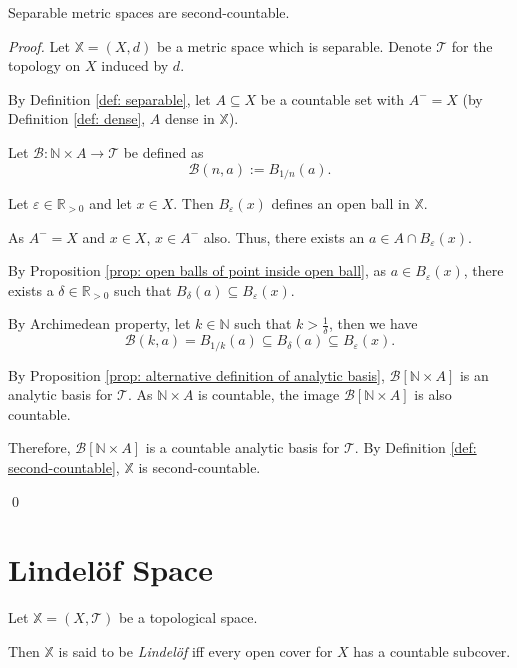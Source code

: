 \begin{proposition}
	Separable metric spaces are second-countable.
	
	\begin{proof}
		Let $\mathbb X = (X, d)$ be a metric space which is separable. Denote $\mathcal T$ for the topology on $X$ induced by $d$.
		
		By Definition \ref{def: separable}, let $A \subseteq X$ be a countable set with $A^- = X$ (by Definition \ref{def: dense}, $A$ dense in $\mathbb X$).
		
		Let $\mathcal B: \mathbb N \times A \to \mathcal T$ be defined as
		$$
		\mathcal B(n, a) := B_{1/n}(a).
		$$
		
		Let $\varepsilon \in \mathbb R_{> 0}$ and let $x \in X$. Then $B_\varepsilon(x)$ defines an open ball in $\mathbb X$.
		
		As $A^- = X$ and $x \in X$, $x \in A^-$ also. Thus, there exists an $a \in A \cap B_\varepsilon (x)$.
		
		By Proposition \ref{prop: open balls of point inside open ball}, as $a \in B_\varepsilon(x)$, there exists a $\delta \in \mathbb R_{> 0}$ such that $B_\delta(a) \subseteq B_\varepsilon (x)$.
		
		By Archimedean property, let $k \in \mathbb N$ such that $k > \frac{1}{\delta}$, then we have
		$$
		\mathcal B(k, a) = B_{1/k}(a) \subseteq B_\delta (a) \subseteq B_\varepsilon (x).
		$$
		
		By Proposition \ref{prop: alternative definition of analytic basis}, $\mathcal B[\mathbb N \times A]$ is an analytic basis for $\mathcal T$. As $\mathbb N \times A$ is countable, the image $\mathcal B[\mathbb N \times A]$ is also countable.
		
		Therefore, $\mathcal B[\mathbb N \times A]$ is a countable analytic basis for $\mathcal T$. By Definition \ref{def: second-countable}, $\mathbb X$ is second-countable.
		
		\qed
	\end{proof}
\end{proposition}


\section{Lindel\"of Space}


\begin{definition}
	\label{def: lindelof}
	Let $\mathbb X = (X, \mathcal T)$ be a topological space.
	
	Then $\mathbb X$ is said to be \textit{Lindel\"of} iff every open cover for $X$ has a countable subcover.
\end{definition}


